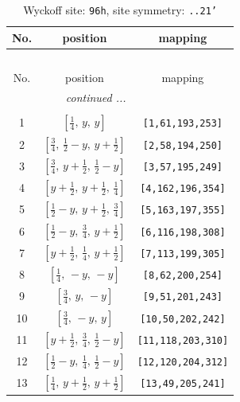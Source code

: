 \documentclass[fleqn,8pt]{jsarticle}
\begin{document}
\begin{longtable}{ccc}
\caption{Wyckoff site: {\tt 96h}, site symmetry: {\tt ..21'}}
 \\
 \hline \hline
No. & position & mapping \\ \hline \endfirsthead

\multicolumn{2}{l}{\tablename\ \thetable{}} \\
 \hline \hline
No. & position & mapping \\ \hline \endhead

 \hline \hline
\multicolumn{2}{r}{\footnotesize\it continued ...} \\ \endfoot

 \hline \hline
\multicolumn{2}{r}{} \\ \endlastfoot

1 & $\left[ \frac{1}{4},\, y,\, y \right]$ & {\tt [1,61,193,253]} \\ \hline
2 & $\left[ \frac{3}{4},\, \frac{1}{2} - y,\, y + \frac{1}{2} \right]$ & {\tt [2,58,194,250]} \\ \hline
3 & $\left[ \frac{3}{4},\, y + \frac{1}{2},\, \frac{1}{2} - y \right]$ & {\tt [3,57,195,249]} \\ \hline
4 & $\left[ y + \frac{1}{2},\, y + \frac{1}{2},\, \frac{1}{4} \right]$ & {\tt [4,162,196,354]} \\ \hline
5 & $\left[ \frac{1}{2} - y,\, y + \frac{1}{2},\, \frac{3}{4} \right]$ & {\tt [5,163,197,355]} \\ \hline
6 & $\left[ \frac{1}{2} - y,\, \frac{3}{4},\, y + \frac{1}{2} \right]$ & {\tt [6,116,198,308]} \\ \hline
7 & $\left[ y + \frac{1}{2},\, \frac{1}{4},\, y + \frac{1}{2} \right]$ & {\tt [7,113,199,305]} \\ \hline
8 & $\left[ \frac{1}{4},\, - y,\, - y \right]$ & {\tt [8,62,200,254]} \\ \hline
9 & $\left[ \frac{3}{4},\, y,\, - y \right]$ & {\tt [9,51,201,243]} \\ \hline
10 & $\left[ \frac{3}{4},\, - y,\, y \right]$ & {\tt [10,50,202,242]} \\ \hline
11 & $\left[ y + \frac{1}{2},\, \frac{3}{4},\, \frac{1}{2} - y \right]$ & {\tt [11,118,203,310]} \\ \hline
12 & $\left[ \frac{1}{2} - y,\, \frac{1}{4},\, \frac{1}{2} - y \right]$ & {\tt [12,120,204,312]} \\ \hline
13 & $\left[ \frac{1}{4},\, y + \frac{1}{2},\, y + \frac{1}{2} \right]$ & {\tt [13,49,205,241]} \\ \hline

\end{longtable}
\end{document}

